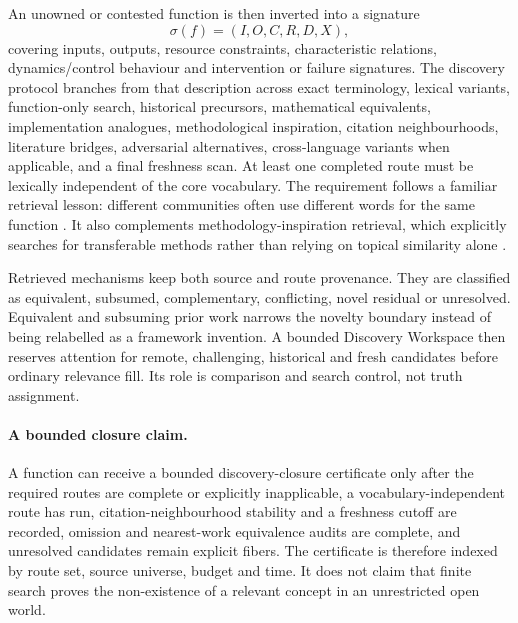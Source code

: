 An unowned or contested function is then inverted into a signature
\[
\sigma(f)=(I,O,C,R,D,X),
\]
covering inputs, outputs, resource constraints, characteristic relations, dynamics/control behaviour and intervention or failure signatures. The discovery protocol branches from that description across exact terminology, lexical variants, function-only search, historical precursors, mathematical equivalents, implementation analogues, methodological inspiration, citation neighbourhoods, literature bridges, adversarial alternatives, cross-language variants when applicable, and a final freshness scan. At least one completed route must be lexically independent of the core vocabulary. The requirement follows a familiar retrieval lesson: different communities often use different words for the same function \cite{furnas1987}. It also complements methodology-inspiration retrieval, which explicitly searches for transferable methods rather than relying on topical similarity alone \cite{garikaparthi2025}.

Retrieved mechanisms keep both source and route provenance. They are classified as equivalent, subsumed, complementary, conflicting, novel residual or unresolved. Equivalent and subsuming prior work narrows the novelty boundary instead of being relabelled as a framework invention. A bounded Discovery Workspace then reserves attention for remote, challenging, historical and fresh candidates before ordinary relevance fill. Its role is comparison and search control, not truth assignment.

\paragraph{A bounded closure claim.}
A function can receive a bounded discovery-closure certificate only after the required routes are complete or explicitly inapplicable, a vocabulary-independent route has run, citation-neighbourhood stability and a freshness cutoff are recorded, omission and nearest-work equivalence audits are complete, and unresolved candidates remain explicit fibers. The certificate is therefore indexed by route set, source universe, budget and time. It does not claim that finite search proves the non-existence of a relevant concept in an unrestricted open world.

